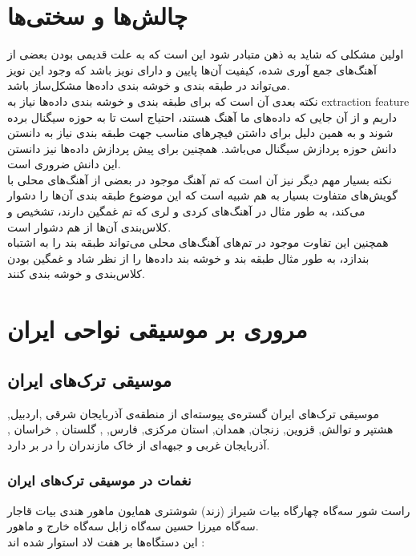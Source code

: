 \section{چالش‌ها و سختی‌ها}
اولین مشکلی که شاید به ذهن متبادر شود این است که به علت قدیمی بودن بعضی از آهنگ‌های جمع آوری شده، کیفیت آن‌ها پایین و دارای
نویز باشد که وجود این نویز می‌تواند در طبقه بندی و خوشه بندی داده‌ها مشکل‌ساز باشد. \\
نکته بعدی آن است که برای طبقه بندی و خوشه بندی داده‌ها نیاز به
extraction feature
داریم و از آن جایی 
که داده‌های ما آهنگ هستند، احتیاج است تا به حوزه سیگنال برده شوند و به همین دلیل برای داشتن فیچرهای مناسب جهت طبقه بندی 
نیاز به دانستن دانش حوزه پردازش سیگنال می‌باشد. همچنین برای پیش پردازش داده‌ها نیز دانستن این دانش ضروری است. \\
نکته بسیار مهم دیگر نیز آن است که تم آهنگ موجود در بعضی از آهنگ‌های محلی با گویش‌های متفاوت بسیار به هم شبیه است که 
این موضوع طبقه بندی آن‌ها را دشوار می‌کند، به طور مثال در آهنگ‌های کردی و لری که تم غمگین دارند، تشخیص و کلاس‌بندی آن‌ها
از هم دشوار است. \\
همچنین این تفاوت موجود در تم‌های آهنگ‌های محلی می‌تواند طبقه بند را به اشتباه بندازد، به طور مثال طبقه بند و خوشه بند داده‌ها را از نظر شاد و 
غمگین بودن کلاس‌بندی و خوشه بندی کنند. \\

\section{مروری بر موسیقی نواحی ایران\cite{ref}}

\subsection{موسیقی ترک‌های ایران}
    موسیقی ترک‌های ایران گستره‌ی پیوسته‌ای از منطقه‌ی آذربایجان شرقی ,اردبیل, هشتپر و توالش, قزوین, زنجان, همدان, استان مرکزی, فارس, , گلستان , خراسان , آذربایجان غربی و جبهه‌ای از خاک مازندران را در بر دارد.
    \subsubsection{نغمات در موسیقی ترک‌های ایران}
        راست شور سه‌گاه چهارگاه بیات شیراز (زند) شوشتری همایون  ماهور هندی بیات قاجار سه‌گاه میرزا حسین  سه‌گاه زابل  سه‌گاه خارج و ماهور.\\
        
        این دستگاه‌ها بر هفت لاد استوار شده اند :\\
        
